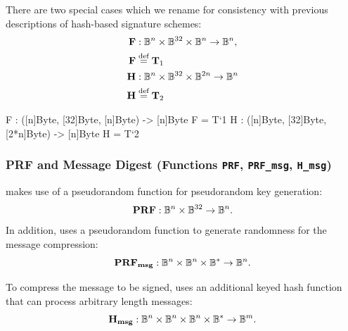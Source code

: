    There are two special cases which we rename for consistency with previous
   descriptions of hash-based signature schemes:
   \begin{align*}
     \mathbf{F} &: \mathbb{B}^n \times \mathbb{B}^{32} \times \mathbb{B}^n \to \mathbb{B}^n, \\
     \mathbf{F} &\stackrel{\text{def}}{=} \mathbf{T}_1\\
     \mathbf{H} &: \mathbb{B}^n \times \mathbb{B}^{32} \times \mathbb{B}^{2n} \to \mathbb{B}^n \\
     \mathbf{H} &\stackrel{\text{def}}{=} \mathbf{T}_2\\
   \end{align*}

\begin{code}
  F : ([n]Byte, [32]Byte, [n]Byte) -> [n]Byte
  F = T`{1}
  H : ([n]Byte, [32]Byte, [2*n]Byte) -> [n]Byte
  H = T`{2}
\end{code}


\subsubsection{PRF and Message Digest (Functions \texttt{PRF}, \texttt{PRF\_msg}, \texttt{H\_msg})}
   \spx makes use of a pseudorandom function \sphincsPRF for pseudorandom key
   generation:
   \begin{equation*}
      \mathbf{PRF}: \mathbb{B}^n \times \mathbb{B}^{32} \to \mathbb{B}^n.
   \end{equation*}
   In addition, \spx uses a pseudorandom function \sphincsPRFmsg to generate
   randomness for the message compression:
   \begin{equation*}
      \mathbf{PRF_{msg}}: \mathbb{B}^n \times \mathbb{B}^n \times \mathbb{B}^* \to \mathbb{B}^n.
   \end{equation*}

   To compress the message to be signed, \spx uses an additional keyed
   hash function \sphincsHmsg that can process arbitrary length messages:
   \begin{equation*}
     \mathbf{H_{msg}}: \mathbb{B}^n\times\mathbb{B}^n\times\mathbb{B}^n \times \mathbb{B}^{*} \to \mathbb{B}^m.
   \end{equation*}


